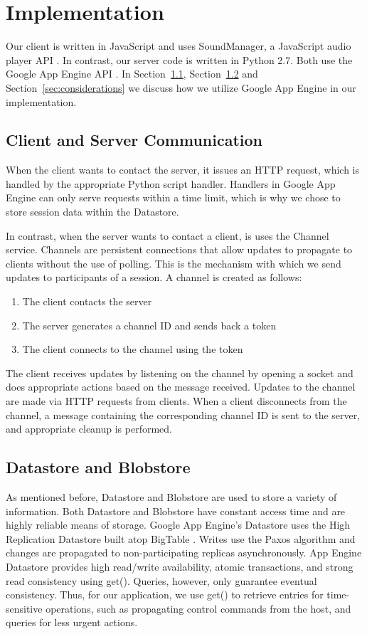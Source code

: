 \section{Implementation}
\label{sec:implementation}
Our client is written in JavaScript and uses SoundManager, a
JavaScript audio player API \cite{soundmanager}. In contrast, our server code is
written in Python 2.7. Both use the Google App Engine API \cite{appengine}. In
Section~\ref{sec:channel}, Section~\ref{sec:storage} and Section~\ref{sec:considerations} 
we discuss how we utilize Google App Engine in our implementation.

\subsection{Client and Server Communication}
\label{sec:channel}
When the client wants to contact the server, it issues an HTTP
request, which is handled by the appropriate Python script handler.
Handlers in Google App Engine can only serve requests within a
time limit, which is why we chose to store session data within
the Datastore.

In contrast, when the server wants to contact a client, is uses 
the Channel service. Channels are persistent connections that 
allow updates to propagate to clients without the use of polling.
This is the mechanism with which we send updates to participants
of a session. A channel is created as follows: 
\begin{enumerate}
  \item The client contacts the server
  \item The server generates a channel ID and sends back a token
  \item The client connects to the channel using the token
\end{enumerate}
The client receives updates by listening on the channel by opening
a socket and does appropriate actions based on the message received.
Updates to the channel are made via HTTP requests from clients. When
a client disconnects from the channel, a message containing the 
corresponding channel ID is sent to the server, and appropriate
cleanup is performed.

\subsection{Datastore and Blobstore}
\label{sec:storage}
As mentioned before, Datastore and Blobstore are used to store a 
variety of information. Both Datastore and Blobstore have constant access time and are highly 
reliable means of storage. Google App Engine's Datastore uses the
High Replication Datastore built atop BigTable \cite{bigtable}. Writes
use the Paxos algorithm and changes are propagated to non-participating
replicas asynchronously. App Engine Datastore 
provides high read/write availability, atomic transactions, and
strong read consistency using get(). Queries, however, only 
guarantee eventual consistency. Thus, for our application, we use
get() to retrieve entries for time-sensitive operations, such as 
propagating control commands from the host, and queries for less 
urgent actions. \cite{appengine}\cite{datastore}

